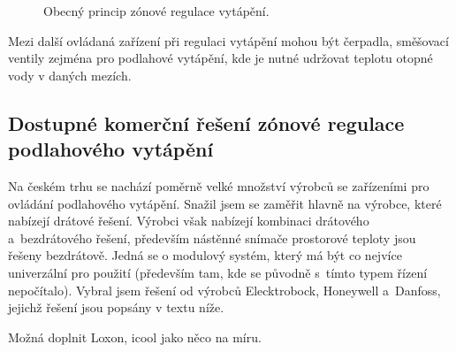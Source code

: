 \newpage
\begin{figure}[H]
    \centering
    \def\svgwidth{\columnwidth}
    
    \caption{Obecný princip zónové regulace vytápění.}
    \label{fig:obecny-princip-zonove-regulace}
\end{figure}

Mezi další ovládaná zařízení při regulaci vytápění mohou být čerpadla, směšovací ventily zejména pro podlahové vytápění, kde je nutné udržovat teplotu otopné vody v daných mezích.

\subsection{Dostupné komerční řešení zónové regulace podlahového vytápění}


Na českém trhu se nachází poměrně velké množství výrobců se zařízeními pro ovládání podlahového vytápění. Snažil jsem se zaměřit hlavně na výrobce, které nabízejí drátové řešení. Výrobci však nabízejí kombinaci drátového a~bezdrátového řešení, především nástěnné snímače prostorové teploty jsou řešeny bezdrátově. Jedná se o modulový systém, který má být co nejvíce univerzální pro použití (především tam, kde se původně s~tímto typem řízení nepočítalo). Vybral jsem řešení od výrobců Elecktrobock, Honeywell a~Danfoss, jejichž řešení jsou popsány v textu níže.

Možná doplnit Loxon, icool jako něco na míru.


